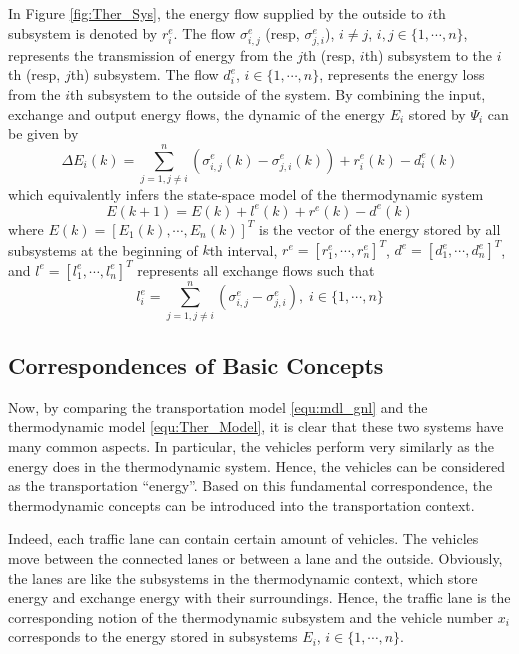 \documentclass[trsc,nonblindrev]{informs3} %
\renewcommand{\vec}[1]{#1}
\begin{document}
In Figure \ref{fig:Ther_Sys}, the energy flow supplied by the outside
to $i$th subsystem is denoted by $r^e_i$. The flow $\sigma^e_{i,j}$
(resp, $\sigma^e_{j,i}$), $i\neq j$, $i,j\in \{1,\cdots,n\}$,
represents the transmission of energy from the $j$th (resp, $i$th)
subsystem to the $i$th (resp, $j$th) subsystem. The flow $d^e_i$,
$i\in \{1,\cdots,n\}$, represents the energy loss from the $i$th
subsystem to the outside of the system. By combining the input,
exchange and output energy flows, the dynamic of the energy $E_i$
stored by $\Psi_i$ can be given by
\begin{equation}\label{equ:Ther_Model_SubSystem}
\Delta E_i(k) = \sum_{j=1,j\neq
i}^{n}(\sigma^e_{i,j}(k)-\sigma^e_{j,i}(k))+r^e_i(k)-d^e_i(k)
\end{equation}
which equivalently infers the state-space model of the thermodynamic
system
\begin{equation}\label{equ:Ther_Model}
    \vec{E}(k+1)=\vec{E}(k)+\vec{l}^e(k)+\vec{r}^e(k)-\vec{d}^e(k)
\end{equation}
where $\vec{E}(k)=[E_1(k),\cdots,E_n(k)]^T$ is the vector of the
energy stored by all subsystems at the beginning of $k$th interval,
$\vec{r}^e=[r^e_1,\cdots,r^e_n]^T$,
$\vec{d}^e=[d^e_{1},\cdots,d^e_{n}]^T$, and
$\vec{l}^e=[l^e_1,\cdots,l^e_n]^T$ represents all exchange flows such
that
\begin{equation*}
l^e_i = \sum_{j=1,j\neq i}^{n}
        (\sigma^e_{i,j}-\sigma^e_{j,i}),
\; i\in \{1,\cdots,n\}
\end{equation*}

\subsection{Correspondences of Basic Concepts}

Now, by comparing the transportation model \eqref{equ:mdl_gnl} and
the thermodynamic model \eqref{equ:Ther_Model}, it is clear that
these two systems have many common aspects. In particular, the
vehicles perform very similarly as the energy does in the
thermodynamic system. Hence, the vehicles can be considered as the
transportation ``energy''. Based on this fundamental correspondence,
the thermodynamic concepts can be introduced into the transportation
context.

Indeed, each traffic lane can contain certain amount of vehicles. The
vehicles move between the connected lanes or between a lane and the
outside. Obviously, the lanes are like the subsystems in the
thermodynamic context, which store energy and exchange energy with
their surroundings. Hence, the traffic lane is the corresponding
notion of the thermodynamic subsystem and the vehicle number $x_i$
corresponds to the energy stored in subsystems $E_i$,
$i\in\{1,\cdots,n\}$.
\end{document}
